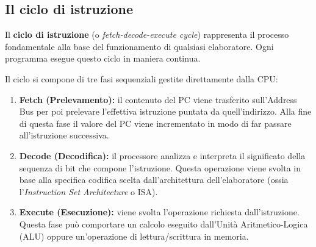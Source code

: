 \documentclass[12pt]{report}
\begin{document}
	\subsection{Il ciclo di istruzione}
	
	Il \textbf{ciclo di istruzione} (o \textit{fetch-decode-execute cycle}) rappresenta il processo fondamentale alla base del funzionamento di qualsiasi elaboratore. Ogni programma esegue questo ciclo in maniera continua.
	
	\begin{center}
	\end{center}
	
	Il ciclo si compone di tre fasi sequenziali gestite direttamente dalla CPU:
	
	\begin{enumerate}
		\item \textbf{Fetch (Prelevamento):} il contenuto del PC viene trasferito sull'Address Bus per poi prelevare l'effettiva istruzione puntata da quell'indirizzo. Alla fine di questa fase il valore del PC viene incrementato in modo di far passare all'istruzione successiva.
		
		\item \textbf{Decode (Decodifica):} il processore analizza e interpreta il significato della sequenza di bit che compone l'istruzione. Questa operazione viene svolta in base alla specifica codifica scelta dall'architettura dell'elaboratore (ossia l'\textit{Instruction Set Architecture} o ISA).
		
		\item \textbf{Execute (Esecuzione):} viene svolta l'operazione richiesta dall'istruzione. Questa fase può comportare un calcolo eseguito dall'Unità Aritmetico-Logica (ALU) oppure un'operazione di lettura/scrittura in memoria.
	\end{enumerate}
	
\end{document}
